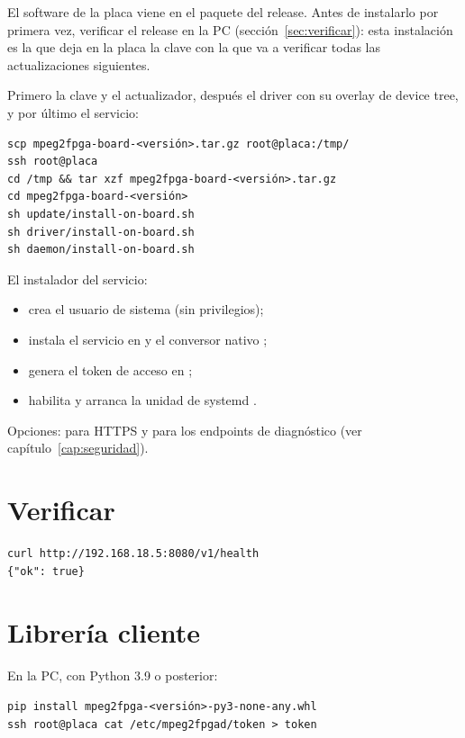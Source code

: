 El software de la placa viene en el paquete
 del release. Antes de instalarlo por
primera vez, verificar el release en la PC (sección~\ref{sec:verificar}):
esta instalación es la que deja en la placa la clave con la que va a
verificar todas las actualizaciones siguientes.

Primero la clave y el actualizador, después el driver con su overlay de
device tree, y por último el servicio:

\begin{lstlisting}[language=shell]
scp mpeg2fpga-board-<versión>.tar.gz root@placa:/tmp/
ssh root@placa
cd /tmp && tar xzf mpeg2fpga-board-<versión>.tar.gz
cd mpeg2fpga-board-<versión>
sh update/install-on-board.sh
sh driver/install-on-board.sh
sh daemon/install-on-board.sh
\end{lstlisting}

El instalador del servicio:
\begin{itemize}
  \item crea el usuario de sistema  (sin privilegios);
  \item instala el servicio en  y el conversor
    nativo ;
  \item genera el token de acceso en ;
  \item habilita y arranca la unidad de systemd .
\end{itemize}

Opciones:  para HTTPS y  para los endpoints de
diagnóstico (ver capítulo~\ref{cap:seguridad}).

\section{Verificar}

\begin{lstlisting}[language=shell]
curl http://192.168.18.5:8080/v1/health
{"ok": true}
\end{lstlisting}

\section{Librería cliente}

En la PC, con Python 3.9 o posterior:

\begin{lstlisting}[language=shell]
pip install mpeg2fpga-<versión>-py3-none-any.whl
ssh root@placa cat /etc/mpeg2fpgad/token > token
\end{lstlisting}
